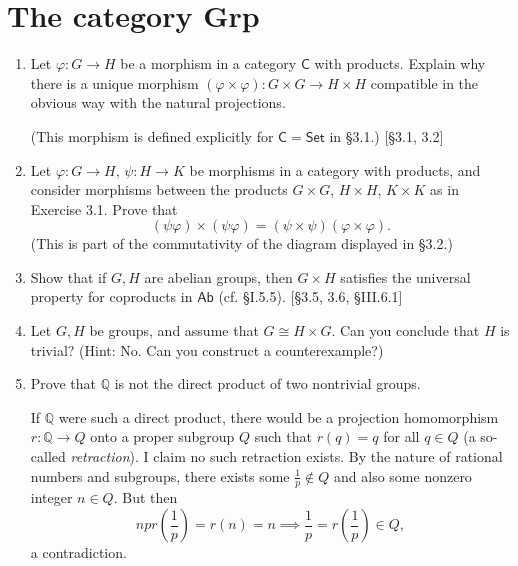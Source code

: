\section{The category Grp}
\begin{enumerate}
    \item Let $\varphi: G \to H$ be a morphism in a category $\mathsf{C}$ with products. Explain why there is a unique morphism $(\varphi \times \varphi): G \times G \to H \times H$ compatible in the obvious way with the natural projections.

          (This morphism is defined explicitly for $\mathsf{C} = \mathsf{Set}$ in \S3.1.) [\S3.1, 3.2]

    \item Let $\varphi: G \to H$, $\psi: H \to K$ be morphisms in a category with products, and consider morphisms between the products $G \times G$, $H \times H$, $K \times K$ as in Exercise 3.1. Prove that
          \[ (\psi\varphi) \times (\psi\varphi) = (\psi \times \psi)(\varphi \times \varphi). \]
          (This is part of the commutativity of the diagram displayed in \S3.2.)

    \item Show that if $G, H$ are abelian groups, then $G \times H$ satisfies the universal property for coproducts in $\mathsf{Ab}$ (cf. \S I.5.5). [\S3.5, 3.6, \S III.6.1]

    \item Let $G, H$ be groups, and assume that $G \cong H \times G$. Can you conclude that $H$ is trivial? (Hint: No. Can you construct a counterexample?)

    \item Prove that $\mathbb{Q}$ is not the direct product of two nontrivial groups.
    \begin{solution}
      If $\mathbb{Q}$ were such a direct product, there would be a projection homomorphism $r:\mathbb{Q} \to Q$ onto a proper subgroup $Q$ such that $r(q) = q$ for all  $q \in Q$ (a so-called \emph{retraction}). I claim no such retraction exists. By the nature of rational numbers and subgroups, there exists some $\frac1p \notin Q$ and also some nonzero integer $n \in Q$. But then \[ np r\left(\frac1p\right) = r(n) = n \implies \frac1p = r\left(\frac1p\right) \in Q,\] a contradiction.
    \end{solution}


\end{enumerate}
